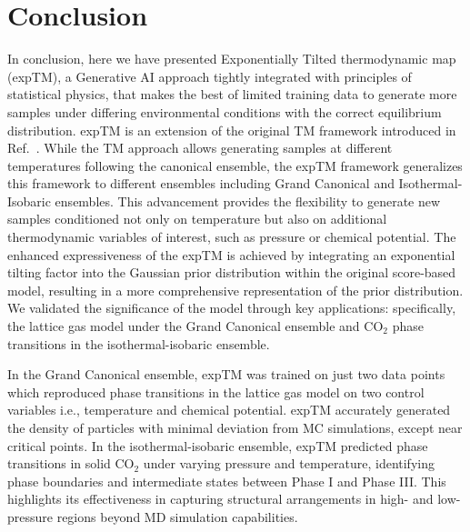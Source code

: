 \documentclass[aip,jcp,reprint,longbibliography]{revtex4-1}
\begin{document}
\section{Conclusion}
\label{sec:conclusion}
In conclusion, here we have presented Exponentially Tilted thermodynamic map (expTM), a Generative AI approach tightly integrated with principles of statistical physics, that makes the best of limited training data to generate more samples under differing environmental conditions with the correct equilibrium distribution.
expTM is an extension of the original TM framework introduced in Ref.~. While the TM approach allows generating samples at different temperatures following the canonical ensemble, the expTM framework generalizes this framework to different ensembles including Grand Canonical and Isothermal-Isobaric ensembles.
This advancement provides the flexibility to generate new samples conditioned not only on temperature but also on additional thermodynamic variables of interest, such as pressure or chemical potential.
The enhanced expressiveness of the expTM is achieved by integrating an exponential tilting factor into the Gaussian prior distribution within the original score-based model, resulting in a more comprehensive representation of the prior distribution.
We validated the significance of the model through key applications: specifically, the lattice gas model under the Grand Canonical ensemble and CO$_2$ phase transitions in the isothermal-isobaric ensemble.

In the Grand Canonical ensemble, expTM was trained on just two data points which reproduced phase transitions in the lattice gas model on two control variables i.e., temperature and chemical potential. expTM accurately generated the density of particles with minimal deviation from MC simulations, except near critical points. In the isothermal-isobaric ensemble, expTM predicted phase transitions in solid CO$_2$ under varying pressure and temperature, identifying phase boundaries and intermediate states between Phase I and Phase III. This highlights its effectiveness in capturing structural arrangements in high- and low-pressure regions beyond MD simulation capabilities.
\end{document}
